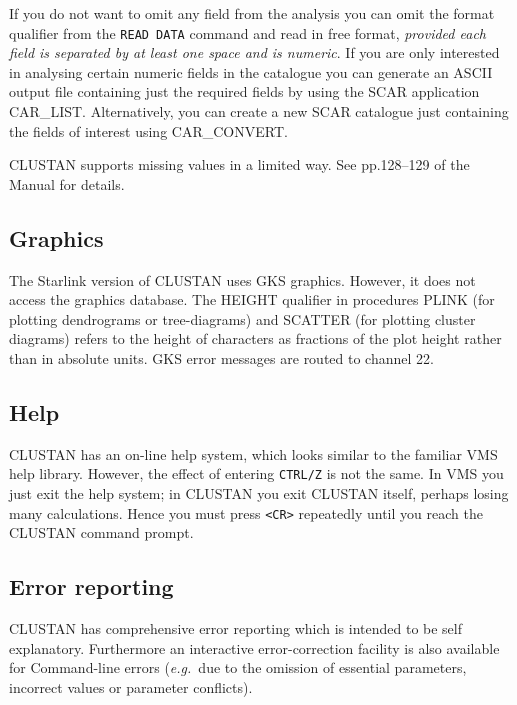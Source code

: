 If you do not want to omit any field from the analysis you can omit
the format qualifier from the {\tt READ DATA} command and read in
free format, {\em provided each field is separated by at least one space
and is numeric}. If you are only interested in analysing certain numeric
fields in the catalogue you can generate an ASCII output file containing
just the required fields by using the SCAR application CAR\_LIST.
Alternatively, you can create a new SCAR catalogue just containing the
fields of interest using CAR\_CONVERT.

{\small CLUSTAN} supports missing values in a limited way.  See pp.128--129
of the Manual for details.

\subsection{Graphics}
The Starlink version of {\small CLUSTAN} uses GKS graphics.  However, it
does not access the graphics database. The HEIGHT qualifier in
procedures PLINK (for plotting dendrograms or tree-diagrams) and SCATTER
(for plotting cluster diagrams) refers to the height of characters as
fractions of the plot height rather than in absolute units. GKS error
messages are routed to channel 22.
\subsection{Help}
{\small CLUSTAN} has an on-line help system, which looks similar to the
familiar VMS help library.  However, the effect of entering {\tt CTRL/Z} is
not the same. In VMS you just exit the help system; in {\small CLUSTAN} you
exit {\small CLUSTAN} itself, perhaps losing many calculations. Hence you must
press {\tt <CR>} repeatedly until you reach the {\small CLUSTAN} command prompt.
\subsection{Error reporting}
{\small CLUSTAN} has comprehensive error reporting which is intended to be
self explanatory. Furthermore an interactive error-correction facility is also
available for Command-line errors ({\it e.g.}\ due to the omission
of essential parameters, incorrect values or parameter conflicts).
